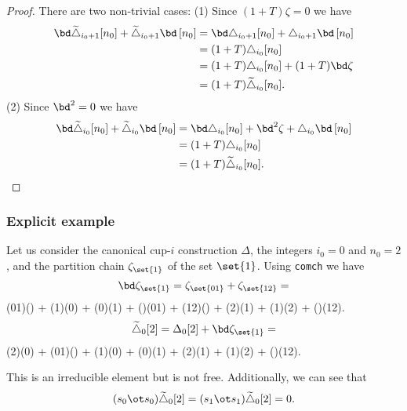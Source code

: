 \begin{proof}
	There are two non-trivial cases:
	(1) Since $(1+T) \zeta = 0$ we have
	\begin{align*}
		\bd \widetilde\triangle_{i_0+1}[n_0] + \widetilde\triangle_{i_0+1} \bd \,[n_0] &=
		\bd \triangle_{i_0+1}[n_0] + \triangle_{i_0+1} \bd \,[n_0] \\ &=
		(1+T)\triangle_{i_0}[n_0] \\ &=
		(1+T)\triangle_{i_0}[n_0] + (1+T) \bd \zeta \\ &=
		(1+T)\widetilde\triangle_{i_0}[n_0] .
	\end{align*}
	(2) Since $\bd^2 = 0$ we have
	\begin{align*}
		\bd \widetilde\triangle_{i_0}[n_0] + \widetilde\triangle_{i_0} \bd \,[n_0] &=
		\bd \triangle_{i_0}[n_0] + \bd^2 \zeta + \triangle_{i_0} \bd \,[n_0] \\ &=
		(1+T)\triangle_{i_0}[n_0] \\ &=
		(1+T)\widetilde\triangle_{i_0}[n_0]. \qedhere
	\end{align*}
\end{proof}

\subsubsection{Explicit example}

Let us consider the canonical cup-$i$ construction $\Delta$, the integers $i_0 = 0$ and $n_0 = 2$, and the partition chain $\zeta_{\set{1}}$ of the set $\set{1}$.
Using \texttt{comch} we have
\[
\bd \zeta_{\set{1}} = \zeta_{\set{01}} + \zeta_{\set{12}} =
\]
\noindent
{\ttfamily (01)() + (1)(0) + (0)(1) + ()(01) + (12)() + (2)(1) + (1)(2) + ()(12).}
\[
\widetilde\triangle_0[2] = \Delta_0[2] + \bd \zeta_{\set{1}} =
\]
\noindent
{\ttfamily (2)(0) + (01)() + (1)(0) + (0)(1) + (2)(1) + (1)(2) + ()(12)}.

\medskip \noindent This is an irreducible element but is not free.
Additionally, we can see that
\[
(s_0 \ot s_0)\widetilde\triangle_0[2] = (s_1 \ot s_1)\widetilde\triangle_0[2] = 0.
\]
